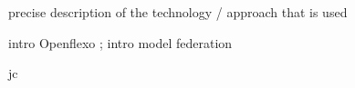 precise  description  of  the  technology  / approach that is used

intro Openflexo ; intro model federation

jc